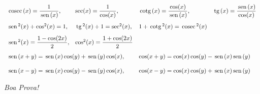 \documentclass[a4paper,5pt]{amsbook}
\newcommand{\sen}{\,\mbox{sen}\,}
\newcommand{\tg}{\,\mbox{tg}\,}
\newcommand{\cosec}{\,\mbox{cosec}\,}
\newcommand{\cotg}{\,\mbox{cotg}\,}
\newcommand{\ds}{\displaystyle}
\begin{document}
\[\begin{array}{llll}
	\vspace{0.3cm}
	\cosec(x) = \displaystyle\frac{1}{\sen(x)}, & \sec(x) = \displaystyle\frac{1}{\cos(x)}, & \cotg(x) = \displaystyle\frac{\cos(x)}{\sen(x)}, & \ds\tg(x) = \frac{\sen(x)}{\cos(x)}\\
	\vspace{0.3cm}
	\sen^2(x) + \cos^2(x) = 1, & \tg^2(x) + 1 = \sec^2(x), & 1 + \cotg^2(x) = \cosec^2(x) & \\
	\vspace{0.3cm}
	\sen^2(x) = \displaystyle\frac{1 - \cos(2x)}{2}, & \cos^2(x) = \displaystyle\frac{1 + \cos(2x)}{2} & & \\
	\multicolumn{2}{l}{\sen(x+y) = \displaystyle\sen(x)\cos(y) + \sen(y)\cos(x),} & \multicolumn{2}{l}{\cos(x+y) = \displaystyle\cos(x)\cos(y) - \sen(x)\sen(y)} \\
	& & & \\
	\multicolumn{2}{l}{\sen(x-y) = \displaystyle\sen(x)\cos(y) - \sen(y)\cos(x),} & \multicolumn{2}{l}{\cos(x-y) = \displaystyle\cos(x)\cos(y) + \sen(x)\sen(y)}
\end{array}\]

\begin{flushright}
	\vspace{1cm}
	\textit{Boa Prova!}
\end{flushright}
\end{document}
